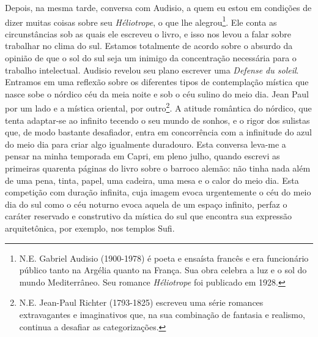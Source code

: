 Depois, na mesma tarde, conversa com Audisio, a quem eu estou em
condições de dizer muitas coisas sobre seu \emph{Héliotrope}, o que lhe
alegrou\footnote{N.E. Gabriel Audisio (1900-1978) é poeta e ensaísta
  francês e era funcionário público tanto na Argélia quanto na França.
  Sua obra celebra a luz e o sol do mundo Mediterrâneo. Seu romance
  \emph{Héliotrope} foi publicado em 1928.}. Ele conta as circunstâncias
sob as quais ele escreveu o livro, e isso nos levou a falar sobre
trabalhar no clima do sul. Estamos totalmente de acordo sobre o absurdo
da opinião de que o sol do sul seja um inimigo da concentração
necessária para o trabalho intelectual. Audisio revelou seu plano
escrever uma \emph{Defense du soleil}. Entramos em uma reflexão sobre os
diferentes tipos de contemplação mística que nasce sobe o nórdico céu da
meia noite e sob o céu sulino do meio dia. Jean Paul por um lado e a
mística oriental, por outro\footnote{N.E. Jean-Paul Richter (1793-1825)
  escreveu uma série romances extravagantes e imaginativos que, na sua
  combinação de fantasia e realismo, continua a desafiar as
  categorizações.}. A atitude romântica do nórdico, que tenta adaptar-se
ao infinito tecendo o seu mundo de sonhos, e o rigor dos sulistas que,
de modo bastante desafiador, entra em concorrência com a infinitude do
azul do meio dia para criar algo igualmente duradouro. Esta conversa
leva-me a pensar na minha temporada em Capri, em pleno julho, quando
escrevi as primeiras quarenta páginas do livro sobre o barroco alemão:
não tinha nada além de uma pena, tinta, papel, uma cadeira, uma mesa e o
calor do meio dia. Esta competição com duração infinita, cuja imagem
evoca urgentemente o céu do meio dia do sul como o céu noturno evoca
aquela de um espaço infinito, perfaz o caráter reservado e construtivo
da mística do sul que encontra sua expressão arquitetônica, por exemplo,
nos templos Sufi.

